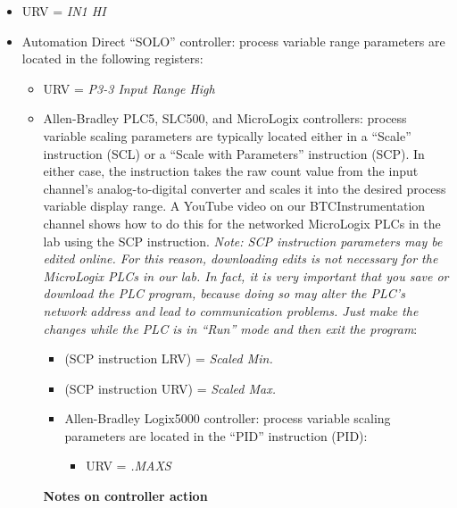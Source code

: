 \begin{itemize}
\begin{itemize}
\begin{itemize}
\begin{itemize}
\begin{itemize}
\item{} URV = {\it IN1 HI}
\vskip 10pt
\item{} Automation Direct ``SOLO'' controller: process variable range parameters are located in the following registers:
\begin{itemize}

\item{} URV = {\it P3-3 Input Range High}
\vskip 10pt
\item{} Allen-Bradley PLC5, SLC500, and MicroLogix controllers: process variable scaling parameters are typically located either in a ``Scale'' instruction (SCL) or a ``Scale with Parameters'' instruction (SCP).  In either case, the instruction takes the raw count value from the input channel's analog-to-digital converter and scales it into the desired process variable display range.  A YouTube video on our BTCInstrumentation channel shows how to do this for the networked MicroLogix PLCs in the lab using the SCP instruction.  {\it Note: SCP instruction parameters may be edited online.  For this reason, downloading edits is not necessary for the MicroLogix PLCs in our lab.  In fact, it is very important that you  save or download the PLC program, because doing so may alter the PLC's network address and lead to communication problems.  Just make the changes while the PLC is in ``Run'' mode and then exit the program}:
\begin{itemize}

\item{} (SCP instruction LRV) = {\it Scaled Min.}
\item{} (SCP instruction URV) = {\it Scaled Max.}
\vskip 10pt
\item{} Allen-Bradley Logix5000 controller: process variable scaling parameters are located in the ``PID'' instruction (PID):
\begin{itemize}

\item{} URV = {\it .MAXS}
\end{itemize}
\end{itemize}








\vfil \eject

\centerline{\bf Notes on controller action}

\vskip 10pt


\end{itemize}
\end{itemize}
\end{itemize}
\end{itemize}
\end{itemize}
\end{itemize}
